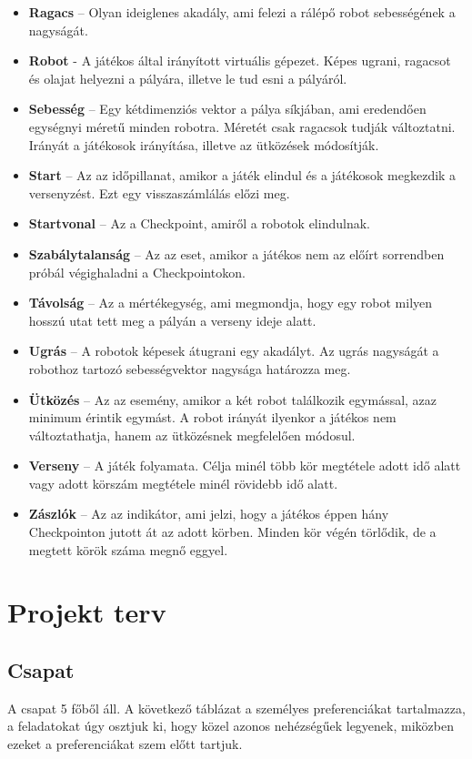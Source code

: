 \begin{itemize}
\item \textbf{Ragacs} – Olyan ideiglenes akadály, ami felezi a rálépő robot sebességének a nagyságát.
\item \textbf{Robot} - A játékos által irányított virtuális gépezet. Képes ugrani, ragacsot és olajat helyezni a pályára, illetve le tud esni a pályáról.
\item \textbf{Sebesség} – Egy kétdimenziós vektor a pálya síkjában, ami eredendően egységnyi méretű minden robotra. Méretét csak ragacsok tudják változtatni. Irányát a játékosok irányítása, illetve az ütközések módosítják.
\item \textbf{Start} – Az az időpillanat, amikor a játék elindul és a játékosok megkezdik a versenyzést. Ezt egy visszaszámlálás előzi meg.
\item \textbf{Startvonal} – Az a Checkpoint, amiről a robotok elindulnak.
\item \textbf{Szabálytalanság} – Az az eset, amikor a játékos nem az előírt sorrendben próbál végighaladni a Checkpointokon.
\item \textbf{Távolság} – Az a mértékegység, ami megmondja, hogy egy robot milyen hosszú utat tett meg a pályán a verseny ideje alatt.
\item \textbf{Ugrás} – A robotok képesek átugrani egy akadályt. Az ugrás nagyságát a robothoz tartozó sebességvektor nagysága határozza meg.
\item \textbf{Ütközés} – Az az esemény, amikor a két robot találkozik egymással, azaz minimum érintik egymást. A robot irányát ilyenkor a játékos nem változtathatja, hanem az ütközésnek megfelelően módosul.
\item \textbf{Verseny} – A játék folyamata. Célja minél több kör megtétele adott idő alatt vagy adott körszám megtétele minél rövidebb idő alatt.
\item \textbf{Zászlók} – Az az indikátor, ami jelzi, hogy a játékos éppen hány Checkpointon jutott át az adott körben. Minden kör végén törlődik, de a megtett körök száma megnő eggyel.
\end{itemize}


\section{Projekt terv}
\subsection{Csapat}
A csapat 5 főből áll. A következő táblázat a személyes preferenciákat tartalmazza, a feladatokat úgy osztjuk ki, hogy közel azonos nehézségűek legyenek, miközben ezeket a preferenciákat szem előtt tartjuk.


